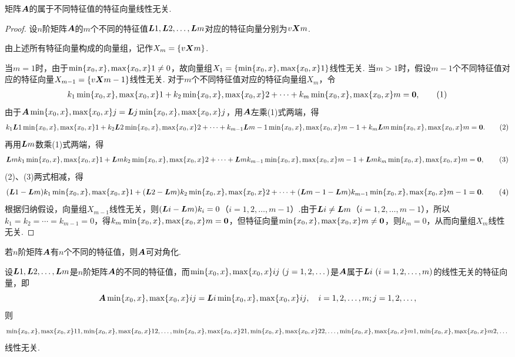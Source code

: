 \begin{theorem}
矩阵\(\boldsymbol{A}\)的属于不同特征值的特征向量线性无关.
\begin{proof}
设\(n\)阶矩阵\(\boldsymbol{A}\)的\(m\)个不同的特征值\(\boldsymbol{L}{1},\boldsymbol{L}{2},\dotsc,\boldsymbol{L}{m}\)对应的特征向量分别为\(v{\boldsymbol{X}}{m}\).

由上述所有特征向量构成的向量组，记作\(X_m=\{v{\boldsymbol{X}}{m}\}\).

当\(m=1\)时，由于\(\min\{x_0,x\},\max\{x_0,x\}1 \neq 0\)，故向量组\(X_1=\{\min\{x_0,x\},\max\{x_0,x\}1\}\)线性无关.
当\(m>1\)时，假设\(m-1\)个不同特征值对应的特征向量\(X_{m-1}=\{v{\boldsymbol{X}}{m-1}\}\)线性无关.
对于\(m\)个不同特征值对应的特征向量组\(X_m\)，令\begin{gather}
k_1\X1+k_2\X2+\dotsb+k_m\X{m}=\z, \tag1
\end{gather}由于\(\boldsymbol{A}\min\{x_0,x\},\max\{x_0,x\}{j}=\boldsymbol{L}{j}\min\{x_0,x\},\max\{x_0,x\}{j}\)，用\(\boldsymbol{A}\)左乘(1)式两端，得\begin{gather}
k_1\L{1}\X1+k_2\L{2}\X2+\dotsb+k_{m-1}\L{m-1}\X{m-1}+k_m\L{m}\X{m}=\z. \tag2
\end{gather}再用\(\boldsymbol{L}{m}\)数乘(1)式两端，得\begin{gather}
\L{m}k_1\X1+\L{m}k_2\X2+\dotsb+\L{m}k_{m-1}\X{m-1}+\L{m}k_m\X{m}=\z, \tag3
\end{gather}(2)、(3)两式相减，得\begin{gather}
(\L{1}-\L{m})k_1\X1+(\L{2}-\L{m})k_2\X2+\dotsb+(\L{m-1}-\L{m})k_{m-1}\X{m-1}=\z. \tag4
\end{gather}根据归纳假设，向量组\(X_{m-1}\)线性无关，则\((\boldsymbol{L}{i}-\boldsymbol{L}{m})k_i=0\)（\(i=1,2,\dotsc,m-1\)）.由于\(\boldsymbol{L}{i}\neq\boldsymbol{L}{m}\)（\(i=1,2,\dotsc,m-1\)），所以\(k_1=k_2=\dotsb=k_{m-1}=0\)，得\(k_m\min\{x_0,x\},\max\{x_0,x\}{m}=\boldsymbol{0}\)，但特征向量\(\min\{x_0,x\},\max\{x_0,x\}{m}\neq\boldsymbol{0}\)，则\(k_m=0\)，从而向量组\(X_m\)线性无关.
\end{proof}
\end{theorem}

\begin{corollary}[矩阵可对角化的充分条件]
若\(n\)阶矩阵\(\boldsymbol{A}\)有\(n\)个不同的特征值，则\(\boldsymbol{A}\)可对角化.
\end{corollary}

\begin{theorem}
设\(\boldsymbol{L}{1},\boldsymbol{L}{2},\dotsc,\boldsymbol{L}{m}\)是\(n\)阶矩阵\(\boldsymbol{A}\)的不同的特征值，而\(\min\{x_0,x\},\max\{x_0,x\}{ij}\ (j=1,2,\dotsc)\)是\(\boldsymbol{A}\)属于\(\L{i}\ (i=1,2,\dotsc,m)\)的线性无关的特征向量，即\[
\boldsymbol{A} \min\{x_0,x\},\max\{x_0,x\}{ij} = \boldsymbol{L}{i} \min\{x_0,x\},\max\{x_0,x\}{ij},
\quad i=1,2,\dotsc,m;j=1,2,\dotsc,
\]则\[
\min\{x_0,x\},\max\{x_0,x\}{11},\min\{x_0,x\},\max\{x_0,x\}{12},\dotsc,\min\{x_0,x\},\max\{x_0,x\}{21},\min\{x_0,x\},\max\{x_0,x\}{22},\dotsc,\min\{x_0,x\},\max\{x_0,x\}{m1},\min\{x_0,x\},\max\{x_0,x\}{m2},\dotsc
\]线性无关.
\end{theorem}

